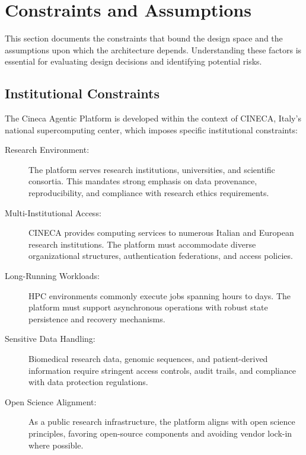 
\section{Constraints and Assumptions}
\label{sec:constraints-assumptions}

This section documents the constraints that bound the design space and the assumptions upon which the architecture depends. Understanding these factors is essential for evaluating design decisions and identifying potential risks.

\subsection{Institutional Constraints}
\label{subsec:institutional-constraints}

The Cineca Agentic Platform is developed within the context of CINECA, Italy's national supercomputing center, which imposes specific institutional constraints:

\begin{description}
    \item[Research Environment:] The platform serves research institutions, universities, and scientific consortia. This mandates strong emphasis on data provenance, reproducibility, and compliance with research ethics requirements.
    
    \item[Multi-Institutional Access:] CINECA provides computing services to numerous Italian and European research institutions. The platform must accommodate diverse organizational structures, authentication federations, and access policies.
    
    \item[Long-Running Workloads:] HPC environments commonly execute jobs spanning hours to days. The platform must support asynchronous operations with robust state persistence and recovery mechanisms.
    
    \item[Sensitive Data Handling:] Biomedical research data, genomic sequences, and patient-derived information require stringent access controls, audit trails, and compliance with data protection regulations.
    
    \item[Open Science Alignment:] As a public research infrastructure, the platform aligns with open science principles, favoring open-source components and avoiding vendor lock-in where possible.
\end{description}

